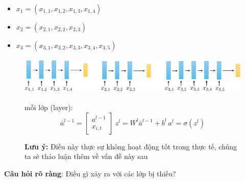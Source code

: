 \documentclass{book}
\begin{document}
\newpage
\begin{itemize}
    \item $x_1=(x_{1, 1},x_{1, 2},x_{1, 3},x_{1, 4})$
    \item $x_2=(x_{2, 1},x_{2, 2},x_{2, 3})$
    \item $x_3=(x_{3, 1},x_{3, 2},x_{3,3},x_{3, 4},x_{3, 5})$
\end{itemize}
\begin{figure}[H]
    \centering
    \includegraphics[width=\textwidth]{images/one_input_per_layer.png}
\end{figure}
\begin{figure}[H]
    \centering
    \begin{minipage}[c]{0.45\textwidth}
        mỗi lớp (layer):
        \begin{equation*}
            \bar{a}^{l-1}=\begin{bmatrix}
                a^{l-1} \\
                x_{i,t}
            \end{bmatrix} \ z^l=W^l\bar{a}^{l-1}+b^l \ a^l=\sigma(z^l)
        \end{equation*}
    \end{minipage}
    \begin{minipage}[c]{0.45\textwidth}
        \textbf{Lưu ý:} Điều này thực sự không hoạt động tốt trong thực tế, chúng ta sẽ thảo luận thêm về vấn đề này sau
    \end{minipage}
\end{figure}
\textbf{Câu hỏi rõ ràng}: Điều gì xảy ra với các lớp bị thiếu?
\end{document}
